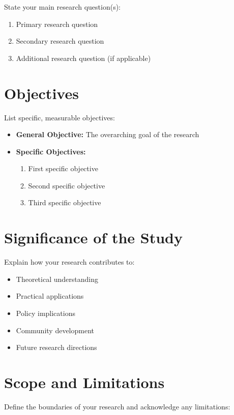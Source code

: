 \documentclass[12pt, a4paper]{report}
\begin{document}
	State your main research question(s):
	
	\begin{enumerate}
		\item Primary research question
		\item Secondary research question
		\item Additional research question (if applicable)
	\end{enumerate}
	
	\section{Objectives}
	\label{sec:objectives}
	
	List specific, measurable objectives:
	
	\begin{itemize}
		\item \textbf{General Objective:} The overarching goal of the research
		\item \textbf{Specific Objectives:}
		\begin{enumerate}
			\item First specific objective
			\item Second specific objective
			\item Third specific objective
		\end{enumerate}
	\end{itemize}
	
	\section{Significance of the Study}
	\label{sec:significance}
	
	Explain how your research contributes to:
	\begin{itemize}
		\item Theoretical understanding
		\item Practical applications
		\item Policy implications
		\item Community development
		\item Future research directions
	\end{itemize}
	
	\section{Scope and Limitations}
	\label{sec:scope}
	
	Define the boundaries of your research and acknowledge any limitations:
	
\end{document}
